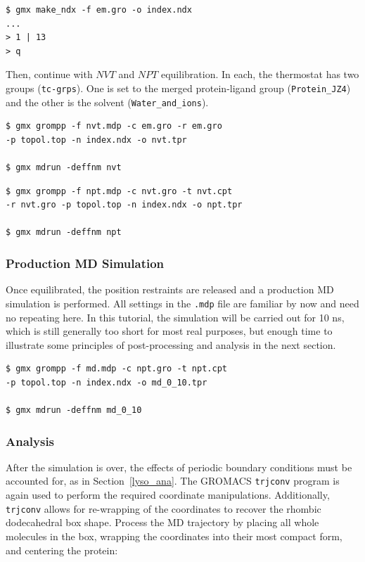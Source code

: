 \documentclass[9pt,tutorial]{livecoms}
\begin{document}
\begin{verbatim}
$ gmx make_ndx -f em.gro -o index.ndx
...
> 1 | 13
> q
\end{verbatim}

Then, continue with $NVT$ and $NPT$ equilibration. In each, the thermostat has two groups (\texttt{tc-grps}). One is set to the merged protein-ligand group (\texttt{Protein\_JZ4}) and the other is the solvent (\texttt{Water\_and\_ions}).

\begin{verbatim}
$ gmx grompp -f nvt.mdp -c em.gro -r em.gro
-p topol.top -n index.ndx -o nvt.tpr

$ gmx mdrun -deffnm nvt
\end{verbatim}

\begin{verbatim}
$ gmx grompp -f npt.mdp -c nvt.gro -t nvt.cpt
-r nvt.gro -p topol.top -n index.ndx -o npt.tpr

$ gmx mdrun -deffnm npt
\end{verbatim}

\subsubsection{Production MD Simulation} \label{complex_md}

Once equilibrated, the position restraints are released and a production MD simulation is performed. All settings in the \texttt{.mdp} file are familiar by now and need no repeating here. In this tutorial, the simulation will be carried out for 10 ns, which is still generally too short for most real purposes, but enough time to illustrate some principles of post-processing and analysis in the next section.

\begin{verbatim}
$ gmx grompp -f md.mdp -c npt.gro -t npt.cpt 
-p topol.top -n index.ndx -o md_0_10.tpr

$ gmx mdrun -deffnm md_0_10
\end{verbatim}

\subsubsection{Analysis} \label{complex_analysis}

After the simulation is over, the effects of periodic boundary conditions must be accounted for, as in Section~\ref{lyso_ana}. The GROMACS \texttt{trjconv} program is again used to perform the required coordinate manipulations. Additionally, \texttt{trjconv} allows for re-wrapping of the coordinates to recover the rhombic dodecahedral box shape. Process the MD trajectory by placing all whole molecules in the box, wrapping the coordinates into their most compact form, and centering the protein:
\end{document}
